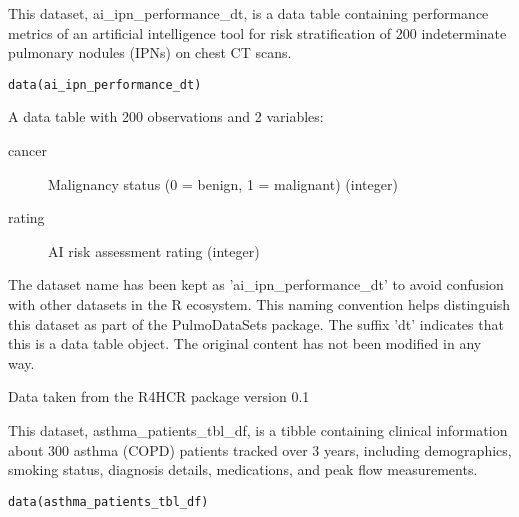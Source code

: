 \documentclass[a4paper]{book}
\begin{document}
%
\begin{Description}
This dataset, ai\_ipn\_performance\_dt, is a data table containing performance metrics
of an artificial intelligence tool for risk stratification of 200 indeterminate
pulmonary nodules (IPNs) on chest CT scans.
\end{Description}
%
\begin{Usage}
\begin{verbatim}
data(ai_ipn_performance_dt)
\end{verbatim}
\end{Usage}
%
\begin{Format}
A data table with 200 observations and 2 variables:
\begin{description}

\item[cancer] Malignancy status (0 = benign, 1 = malignant) (integer)
\item[rating] AI risk assessment rating (integer)

\end{description}

\end{Format}
%
\begin{Details}
The dataset name has been kept as 'ai\_ipn\_performance\_dt' to avoid confusion with other
datasets in the R ecosystem. This naming convention helps distinguish this dataset
as part of the PulmoDataSets package. The suffix 'dt' indicates that this is a
data table object. The original content has not been modified in any way.
\end{Details}
%
\begin{Source}
Data taken from the R4HCR package version 0.1
\end{Source}
%
\begin{Description}
This dataset, asthma\_patients\_tbl\_df, is a tibble containing clinical information
about 300 asthma (COPD) patients tracked over 3 years, including demographics,
smoking status, diagnosis details, medications, and peak flow measurements.
\end{Description}
%
\begin{Usage}
\begin{verbatim}
data(asthma_patients_tbl_df)
\end{verbatim}
\end{Usage}
%
\end{document}
